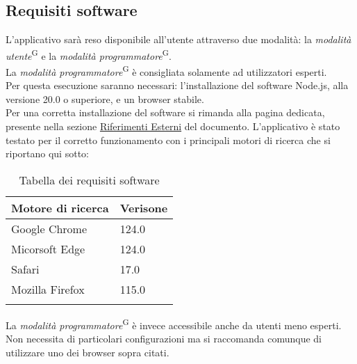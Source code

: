     \subsection{Requisiti software}\label{sec:requisiti_e_compatibilità:software}
    L'applicativo sarà reso disponibile all'utente attraverso due modalità: la \textit{modalità utente}\textsuperscript{G} e la \textit{modalità programmatore}\textsuperscript{G}.\\
    La \textit{modalità programmatore}\textsuperscript{G} è consigliata solamente ad utilizzatori esperti. \\
    Per questa esecuzione saranno necessari: l'installazione del software Node.js, alla versione 20.0 o superiore, e un browser stabile. \\
    Per una corretta installazione del software si rimanda alla pagina dedicata, presente nella sezione \hyperref[sec:riferimenti_esterni]{Riferimenti Esterni} del documento. 
    L'applicativo è stato testato per il corretto funzionamento con i principali motori di ricerca che si riportano qui sotto:
    \begin{xltabular}{\textwidth}{ X | X}

        \textbf{\color{white} Motore di ricerca} & \textbf{\color{white} Verisone}\\ 
        \hline
        \endhead

        Google Chrome & 124.0 \\
        \hline

        Micorsoft Edge & 124.0 \\
        \hline
        
        Safari & 17.0 \\
        \hline

        Mozilla Firefox & 115.0 \\
        \hline
        
        \caption{Tabella dei requisiti software}
        \label{tab:requisiti:soft}
    \end{xltabular}
    La \textit{modalità programmatore}\textsuperscript{G} è invece accessibile anche da utenti meno esperti. Non necessita di particolari configurazioni ma si raccomanda 
    comunque di utilizzare uno dei browser sopra citati. \\



